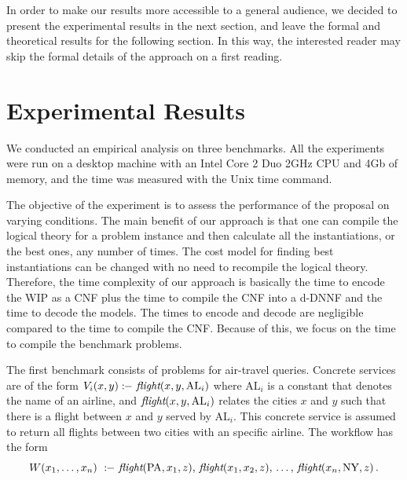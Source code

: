 \documentclass{llncs}
\newcommand{\qrule}{:\!\!-}
\newcommand{\flight}{\text{\it flight}}
\newcommand{\PA}{\text{PA}}
\newcommand{\NY}{\text{NY}}
\newcommand{\AL}{\text{AL}}
\begin{document}
In order to make our results more accessible to a general audience, we decided
to present the experimental results in the next section, and leave the formal
and theoretical results for the following section. In this way, the interested
reader may skip the formal details of the approach on a first reading.

\section{Experimental Results}

We conducted an empirical analysis on three benchmarks.
All the experiments were run on a desktop machine with an Intel
Core 2 Duo 2GHz CPU and 4Gb of memory, and the time was measured
with the Unix time command.

The objective of the experiment is to assess the performance
of the proposal on varying conditions. The main benefit of our approach
is that one can compile the logical theory for a problem instance
and then calculate all the instantiations, or the best ones, any 
number of times. The cost model for finding best instantiations
can be changed with no need to recompile the logical theory.
Therefore, the time complexity of our approach is basically the
time to encode the WIP as a CNF plus the time to compile the
CNF into a d-DNNF and the time to decode the models. 
The times to encode and decode are negligible compared to
the time to compile the CNF. Because of this, we focus on the
time to compile the benchmark problems.

The first benchmark consists of problems for air-travel queries.
Concrete services are of the form $V_i(x,y)\qrule\ \flight(x,y,\AL_i)$
where $\AL_i$ is a constant that denotes the name of an airline, 
and $\flight(x,y,\AL_i)$ relates the cities $x$ and $y$ such that
there is a flight between $x$ and $y$ served by $\AL_i$. This concrete
service is assumed to return all flights between two cities with an
specific airline. The workflow has the form 
\[ W(x_1,\ldots,x_n)\ \qrule\ \flight(\PA,x_1,z),\,\flight(x_1,x_2,z),\,\ldots,\,\flight(x_n,\NY,z)\,. \]
\end{document}
